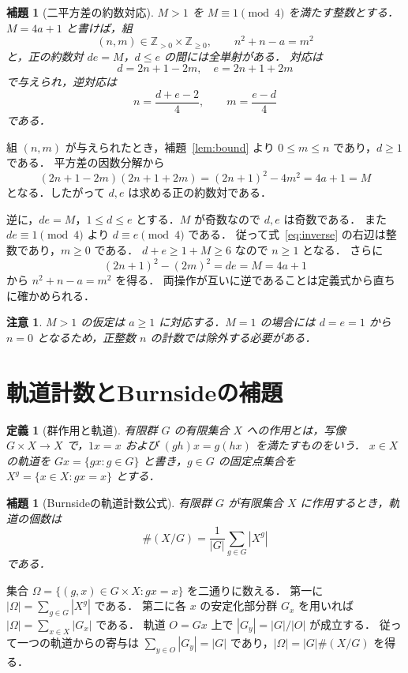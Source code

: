 \documentclass[a5paper,10pt,onecolumn]{jsarticle}
\makeatletter
\theoremstyle{mathnotetheorem}
\newtheorem{definition}[theorem]{定義}
\newtheorem{lemma}[theorem]{補題}
\newtheorem{remark}[theorem]{注意}
\renewcommand{\proofname}{証明}
\renewenvironment{proof}[1][\proofname]{%
  \par\pushQED{\qed}\normalfont\topsep4\p@\@plus2\p@\relax
  \trivlist\item[\hskip\labelsep\bfseries #1]\ignorespaces
}{\popQED\endtrivlist\@endpefalse}
\makeatother
\begin{document}
\begin{lemma}[二平方差の約数対応]\label{lem:pairs}
$M>1$ を $M\equiv1\pmod 4$ を満たす整数とする．
$M=4a+1$ と書けば，組
\[
 (n,m)\in\mathbb Z_{>0}\times\mathbb Z_{\ge0},\qquad n^2+n-a=m^2
\]
と，正の約数対 $de=M$，$d\le e$ の間には全単射がある．
対応は
\[
 d=2n+1-2m,\quad e=2n+1+2m
\]
で与えられ，逆対応は
\begin{equation}\label{eq:inverse}
 n=\frac{d+e-2}{4},\qquad m=\frac{e-d}{4}
\end{equation}
である．
\end{lemma}
\begin{proof}
組 $(n,m)$ が与えられたとき，補題~\ref{lem:bound} より $0\le m\le n$ であり，$d\ge1$ である．
平方差の因数分解から
\[
 (2n+1-2m)(2n+1+2m)
 =(2n+1)^2-4m^2=4a+1=M
\]
となる．したがって $d,e$ は求める正の約数対である．

逆に，$de=M$，$1\le d\le e$ とする．$M$ が奇数なので $d,e$ は奇数である．
また $de\equiv1\pmod4$ より $d\equiv e\pmod4$ である．
従って式~\eqref{eq:inverse} の右辺は整数であり，$m\ge0$ である．
$d+e\ge 1+M\ge6$ なので $n\ge1$ となる．
さらに
\[
 (2n+1)^2-(2m)^2=de=M=4a+1
\]
から $n^2+n-a=m^2$ を得る．
両操作が互いに逆であることは定義式から直ちに確かめられる．
\end{proof}

\begin{remark}
$M>1$ の仮定は $a\ge1$ に対応する．$M=1$ の場合には $d=e=1$ から $n=0$ となるため，正整数 $n$ の計数では除外する必要がある．
\end{remark}

\section{軌道計数とBurnsideの補題}
\begin{definition}[群作用と軌道]
有限群 $G$ の有限集合 $X$ への作用とは，写像 $G\times X\to X$ で，$1x=x$ および $(gh)x=g(hx)$ を満たすものをいう．
$x\in X$ の軌道を $Gx=\{gx:g\in G\}$ と書き，$g\in G$ の固定点集合を $X^g=\{x\in X:gx=x\}$ とする．
\end{definition}
\begin{lemma}[Burnsideの軌道計数公式]\label{lem:burnside}
有限群 $G$ が有限集合 $X$ に作用するとき，軌道の個数は
\[
 \#(X/G)=\frac{1}{|G|}\sum_{g\in G}|X^g|
\]
である．
\end{lemma}
\begin{proof}
集合 $\Omega=\{(g,x)\in G\times X:gx=x\}$ を二通りに数える．
第一に $|\Omega|=\sum_{g\in G}|X^g|$ である．
第二に各 $x$ の安定化部分群 $G_x$ を用いれば
$|\Omega|=\sum_{x\in X}|G_x|$ である．
軌道 $O=Gx$ 上で $|G_y|=|G|/|O|$ が成立する．
従って一つの軌道からの寄与は $\sum_{y\in O}|G_y|=|G|$ であり，$|\Omega|=|G|\#(X/G)$ を得る．
\end{proof}
\end{document}
